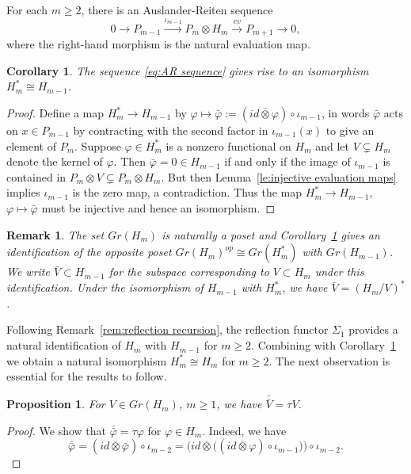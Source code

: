 \documentclass{amsart}
\newtheorem{corollary}[theorem]{Corollary}
\newtheorem{proposition}[theorem]{Proposition}
\newtheorem{remark}[theorem]{Remark}
\begin{document}
For each $m\ge2$, there is an Auslander-Reiten sequence \cite{auslander-reiten-smalo}
\begin{equation}
  \label{eq:AR sequence}
  0\longrightarrow P_{m-1}\stackrel{\iota_{m-1}}{\longrightarrow} P_m\otimes H_m\stackrel{ev}{\longrightarrow} P_{m+1}\longrightarrow 0,
\end{equation}
where the right-hand morphism is the natural evaluation map.
\begin{corollary}
  \label{cor:preprojective homomorphism duality}
  The sequence \eqref{eq:AR sequence} gives rise to an isomorphism $H_m^*\cong H_{m-1}$.
\end{corollary}
\begin{proof}
  Define a map $H_m^*\to H_{m-1}$ by $\varphi\mapsto\bar{\varphi}:=(id\overline{\otimes}\varphi)\circ\iota_{m-1}$, in words $\bar{\varphi}$ acts on $x\in P_{m-1}$ by contracting with the second factor in $\iota_{m-1}(x)$ to give an element of $P_m$.
  Suppose $\varphi\in H_m^*$ is a nonzero functional on $H_m$ and let $V\subsetneq H_m$ denote the kernel of $\varphi$.
  Then $\bar{\varphi}=0\in H_{m-1}$ if and only if the image of $\iota_{m-1}$ is contained in $P_m\otimes V\subsetneq P_m\otimes H_m$.
  But then Lemma~\ref{le:injective evaluation maps} implies $\iota_{m-1}$ is the zero map, a contradiction.
  Thus the map $H_m^*\to H_{m-1}$, $\varphi\mapsto\bar{\varphi}$ must be injective and hence an isomorphism.
\end{proof}
\begin{remark}
  The set $Gr(H_m)$ is naturally a poset and Corollary~\ref{cor:preprojective homomorphism duality} gives an identification of the opposite poset $Gr(H_m)^{op}\cong Gr(H_m^*)$ with $Gr(H_{m-1})$.
  We write $\bar{V}\subset H_{m-1}$ for the subspace corresponding to $V\subset H_m$ under this identification.
  Under the isomorphism of $H_{m-1}$ with $H_m^*$, we have $\bar{V}=(H_m/V)^*$.
\end{remark}
Following Remark~\ref{rem:reflection recursion}, the reflection functor $\Sigma_1$ provides a natural identification of $H_m$ with $H_{m-1}$ for $m\ge2$. 
Combining with Corollary~\ref{cor:preprojective homomorphism duality} we obtain a natural isomorphism $H_m^*\cong H_m$ for $m\ge2$.
The next observation is essential for the results to follow.
\begin{proposition}
  For $V\in Gr(H_m)$, $m\ge1$, we have $\bar{\bar{V}}=\tau V$.
\end{proposition}
\begin{proof}
  We show that $\bar{\bar{\varphi}}=\tau\varphi$ for $\varphi\in H_m$.
  Indeed, we have
  \[\bar{\bar{\varphi}}=(id\overline{\otimes}\bar{\varphi})\circ\iota_{m-2}=\Big(id\overline{\otimes}\big((id\overline{\otimes}\varphi)\circ\iota_{m-1}\big)\Big)\circ\iota_{m-2}.\]
\end{proof}
\end{document}
